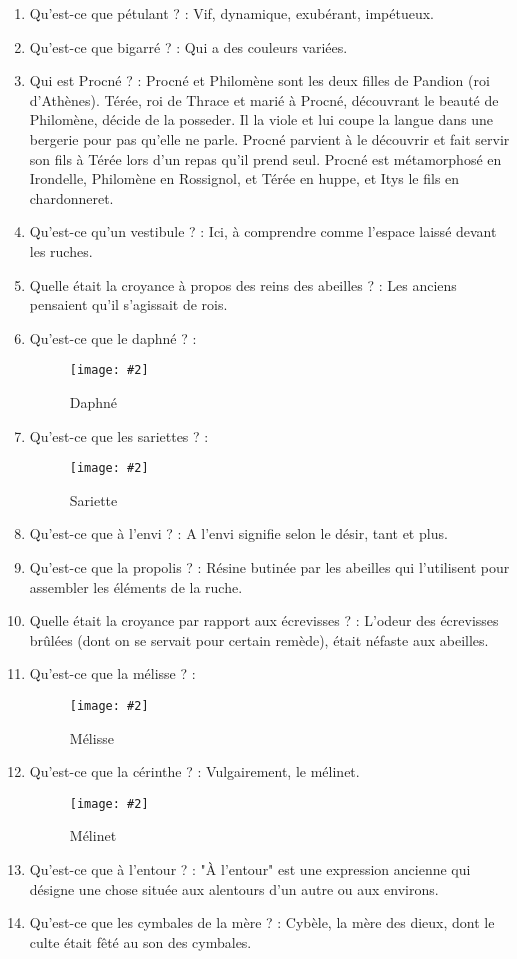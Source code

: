\documentclass[a4paper, 11pt, hidelinks]{article}
\newcommand{\img}[4]{\begin{figure}[!ht]
    \centering
    \texttt{[image: \#2]}
    \caption{#3}
    \label{#4}
    \end{figure} }
\begin{document}
\begin{enumerate}
      \item Qu'est-ce que pétulant ? : Vif, dynamique, exubérant, impétueux.
      \item Qu'est-ce que bigarré ? : Qui a des couleurs variées.
      \item Qui est Procné ? : Procné et Philomène sont les deux filles de Pandion (roi d'Athènes).
            Térée, roi de Thrace et marié à Procné, découvrant le beauté de Philomène, décide de la posseder.
            Il la viole et lui coupe la langue dans une bergerie pour pas qu'elle ne parle.
            Procné parvient à le découvrir et fait servir son fils à Térée lors d'un repas qu'il prend seul.
            Procné est métamorphosé en Irondelle, Philomène en Rossignol, et Térée en huppe, et Itys le fils en chardonneret.
      \item Qu'est-ce qu'un vestibule ? : Ici, à comprendre comme l'espace laissé devant les ruches.
      \item Quelle était la croyance à propos des reins des abeilles ? : Les anciens pensaient qu'il s'agissait de rois.
      \item Qu'est-ce que le daphné ? :
            \img{0.5}{Daphne.jpg}{Daphné}{131}
      \item Qu'est-ce que les sariettes ? :
            \img{0.5}{Sariette.jpg}{Sariette}{132}
      \item Qu'est-ce que à l'envi ? : A l'envi signifie selon le désir, tant et plus.
      \item Qu'est-ce que la propolis ? : Résine butinée par les abeilles qui l'utilisent pour assembler les éléments de la ruche.
      \item Quelle était la croyance par rapport aux écrevisses ? : L'odeur des écrevisses brûlées (dont on se servait pour certain remède),
            était néfaste aux abeilles.
      \item Qu'est-ce que la mélisse ? :
            \img{0.5}{Melisse.jpg}{Mélisse}{133}
            \newpage
      \item Qu'est-ce que la cérinthe ? : Vulgairement, le mélinet.
            \img{0.5}{Melinet.jpg}{Mélinet}{134}
      \item Qu'est-ce que à l'entour ? : "À l'entour" est une expression ancienne qui désigne une chose située aux alentours d'un autre ou aux environs.
      \item Qu'est-ce que les cymbales de la mère ? : Cybèle, la mère des dieux, dont le culte était fêté au son des cymbales.

\end{enumerate}
\end{document}
